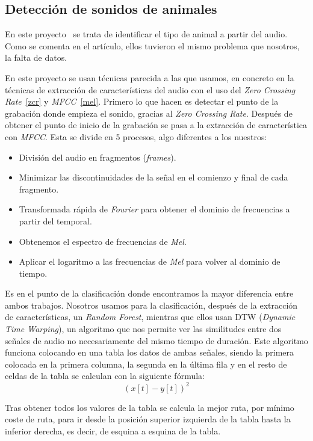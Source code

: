 \subsection{Detección de sonidos de animales}
En este proyecto~\cite{yeo2011animal} se trata de identificar el tipo de animal a partir del audio. Como se comenta en el artículo, ellos tuvieron el mismo problema que nosotros, la falta de datos.

En este proyecto se usan técnicas parecida a las que usamos, en concreto en la técnicas de extracción de características del audio con el uso del \textit{Zero Crossing Rate}~\ref{zcr} y \textit{MFCC}~\ref{mel}. Primero lo que hacen es detectar el punto de la grabación donde empieza el sonido, gracias al \textit{Zero Crossing Rate}. Después de obtener el punto de inicio de la grabación se pasa a la extracción de característica con \textit{MFCC}. Esta se divide en 5 procesos, algo diferentes a los nuestros:
\begin{itemize}
	\item División del audio en fragmentos (\textit{frames}).
	\item Minimizar las discontinuidades de la señal en el comienzo y final de cada fragmento.
	\item Transformada rápida de \textit{Fourier} para obtener el dominio de frecuencias a partir del temporal.
	\item Obtenemos el espectro de frecuencias de \textit{Mel}.
	\item Aplicar el logaritmo a las frecuencias de \textit{Mel} para volver al dominio de tiempo.
\end{itemize}

Es en el punto de la clasificación donde encontramos la mayor diferencia entre ambos trabajos. Nosotros usamos para la clasificación, después de la extracción de características, un \textit{Random Forest}, mientras que ellos usan DTW (\textit{Dynamic Time Warping}), un algoritmo que nos permite ver las similitudes entre dos señales de audio no necesariamente del mismo tiempo de duración. Este algoritmo funciona colocando en una tabla los datos de ambas señales, siendo la primera colocada en la primera columna, la segunda en la última fila y en el resto de celdas de la tabla se calculan con la siguiente fórmula:\[(x[t]-y[t])^2\]

Tras obtener todos los valores de la tabla se calcula la mejor ruta, por mínimo coste de ruta, para ir desde la posición superior izquierda de la tabla hasta la inferior derecha, es decir, de esquina a esquina de la tabla.


